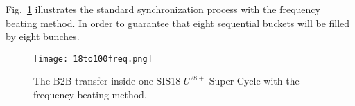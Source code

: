 Fig.~\ref{18to100freq} illustrates the standard synchronization process with the frequency beating method. In order to guarantee that eight sequential buckets will be filled by eight bunches.
\begin{figure}[!htb]
   \centering   
   \texttt{[image: 18to100freq.png]}
   \caption{The B2B transfer inside one SIS18 $U^{28+}$ Super Cycle with the frequency beating method.}
   \label{18to100freq}
\end{figure}